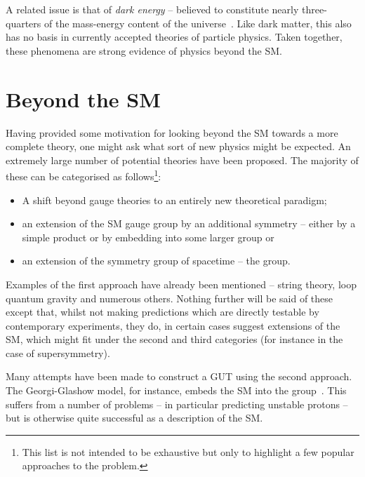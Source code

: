 A related issue is that of \emph{dark energy} -- believed to constitute nearly
three-quarters of the mass-energy content of the
universe~\cite{wmap_7year}. Like dark matter, this also has no basis in
currently accepted theories of particle physics. Taken together, these phenomena
are strong evidence of physics beyond the \ac{SM}.

\section{Beyond the \acl{SM}}
Having provided some motivation for looking beyond the \ac{SM} towards a more
complete theory, one might ask what sort of new physics might be expected. An
extremely large number of potential theories have been proposed. The majority of
these can be categorised as follows\footnote{This list is not intended to be
  exhaustive but only to highlight a few popular approaches to the problem.}:
\begin{itemize}
\item A shift beyond gauge theories to an entirely new theoretical paradigm;
\item an extension of the \ac{SM} gauge group by an additional symmetry -- either
  by a simple product or by embedding into some larger group or
\item an extension of the symmetry group of spacetime -- the \Poincare group.
\end{itemize}

Examples of the first approach have already been mentioned -- string theory, loop
quantum gravity and numerous others. Nothing further will be said of these
except that, whilst not making predictions which are directly testable by
contemporary experiments, they do, in certain cases suggest extensions of the
\ac{SM}, which might fit under the second and third categories (for instance in
the case of supersymmetry).

Many attempts have been made to construct a \acl{GUT} using the second
approach. The Georgi-Glashow model, for instance, embeds the \ac{SM} into the
\SUfive group~\cite{georgi_glashow}. This suffers from a number of problems -- in
particular predicting unstable protons -- but is otherwise quite successful as a
description of the \ac{SM}.

